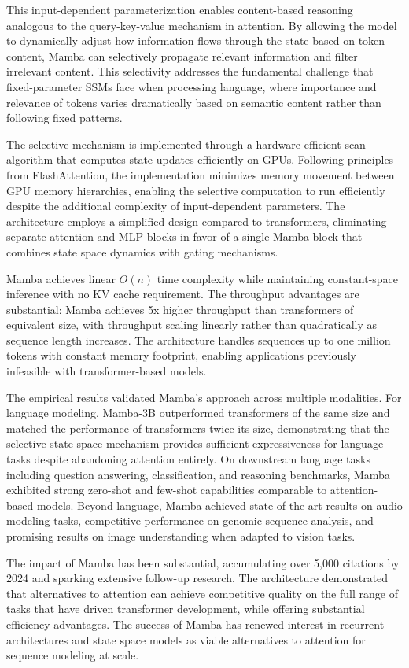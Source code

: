 This input-dependent parameterization enables content-based reasoning analogous to the query-key-value mechanism in attention. By allowing the model to dynamically adjust how information flows through the state based on token content, Mamba can selectively propagate relevant information and filter irrelevant content. This selectivity addresses the fundamental challenge that fixed-parameter SSMs face when processing language, where importance and relevance of tokens varies dramatically based on semantic content rather than following fixed patterns.

The selective mechanism is implemented through a hardware-efficient scan algorithm that computes state updates efficiently on GPUs. Following principles from FlashAttention, the implementation minimizes memory movement between GPU memory hierarchies, enabling the selective computation to run efficiently despite the additional complexity of input-dependent parameters. The architecture employs a simplified design compared to transformers, eliminating separate attention and MLP blocks in favor of a single Mamba block that combines state space dynamics with gating mechanisms.

Mamba achieves linear $O(n)$ time complexity while maintaining constant-space inference with no KV cache requirement. The throughput advantages are substantial: Mamba achieves 5x higher throughput than transformers of equivalent size, with throughput scaling linearly rather than quadratically as sequence length increases. The architecture handles sequences up to one million tokens with constant memory footprint, enabling applications previously infeasible with transformer-based models.

The empirical results validated Mamba's approach across multiple modalities. For language modeling, Mamba-3B outperformed transformers of the same size and matched the performance of transformers twice its size, demonstrating that the selective state space mechanism provides sufficient expressiveness for language tasks despite abandoning attention entirely. On downstream language tasks including question answering, classification, and reasoning benchmarks, Mamba exhibited strong zero-shot and few-shot capabilities comparable to attention-based models. Beyond language, Mamba achieved state-of-the-art results on audio modeling tasks, competitive performance on genomic sequence analysis, and promising results on image understanding when adapted to vision tasks.

The impact of Mamba has been substantial, accumulating over 5,000 citations by 2024 and sparking extensive follow-up research. The architecture demonstrated that alternatives to attention can achieve competitive quality on the full range of tasks that have driven transformer development, while offering substantial efficiency advantages. The success of Mamba has renewed interest in recurrent architectures and state space models as viable alternatives to attention for sequence modeling at scale.

